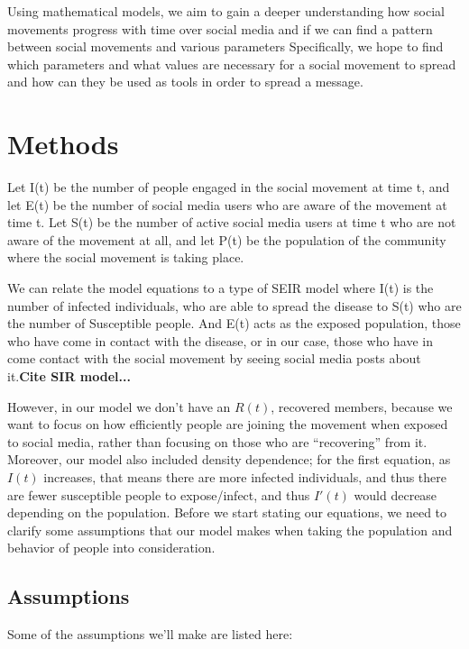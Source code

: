 \documentclass{article}
\begin{document}
    
    Using mathematical models, we aim to gain a deeper understanding how social movements progress with time over social media and if we can find a pattern between social movements and various parameters Specifically, we hope to find which parameters and what values are necessary for a social movement to spread and how can they be used as tools in order to spread a message.

    \section{Methods}

    

    Let I(t) be the number of people engaged in the social movement at time t, and let E(t) be the number of social media users who are aware of the movement at time t. Let S(t) be the number of active social media users at time t who are not aware of the movement at all, and let P(t) be the population of the community where the social movement is taking place. 
    
    We can relate the model equations to a type of SEIR model where I(t) is the number of infected individuals, who are able to spread the disease to S(t) who are the number of Susceptible people. And E(t) acts as the exposed population, those who have come in contact with the disease, or in our case, those who have in come contact with the social movement by seeing social media posts about it.\textbf{Cite SIR model...} 
    
    However, in our model we don’t have an $R(t)$, recovered members, because we want to focus on how efficiently people are joining the movement when exposed to social media, rather than focusing on those who are “recovering” from it. Moreover, our model also included density dependence; for the first equation, as $I(t)$ increases, that means there are more infected individuals, and thus there are fewer susceptible people to expose/infect, and thus $I'(t)$ would decrease depending on the population.
    Before we start stating our equations, we need to clarify some assumptions that our model makes when taking the population and behavior of people into consideration.

    \subsection{Assumptions}
    
    Some of the assumptions we'll make are listed here:
\end{document}
